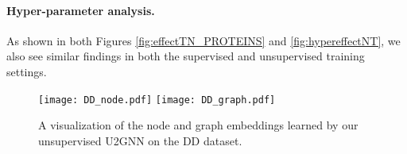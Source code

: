\documentclass[twoside,leqno,twocolumn]{article}
\begin{document}
\paragraph{Hyper-parameter analysis.} As shown in both Figures \ref{fig:effectTN_PROTEINS} and \ref{fig:hypereffectNT}, we also see similar findings in both the supervised and unsupervised training settings.

\begin{figure}[ht]
\centering
    \texttt{[image: DD\_node.pdf]}
    \texttt{[image: DD\_graph.pdf]}
\caption[short]{A visualization of the node and graph embeddings learned by our unsupervised U2GNN on the DD dataset.}
\label{fig:visualunsupembeddings}
\end{figure}
\end{document}
